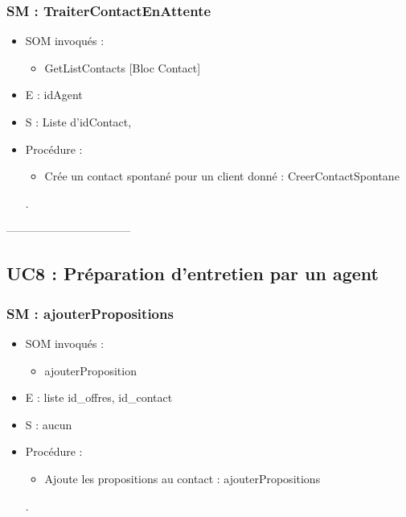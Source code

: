 \subsubsection{SM : TraiterContactEnAttente}
\begin{itemize}
	\item SOM invoqués : 
		\begin{itemize}
			\item GetListContacts [Bloc Contact]
		\end{itemize}
	\item E : idAgent
	\item S : Liste d’idContact, 
	\item Procédure : 
		\begin{itemize}
			\item Crée un contact spontané pour un client donné : CreerContactSpontane
		\end{itemize}.
\end{itemize}

---------------------------------
\subsection{UC8 : Préparation d’entretien par un agent}
\subsubsection{SM : ajouterPropositions}
\begin{itemize}
	\item SOM invoqués :
	\begin{itemize}
		\item ajouterProposition
	\end{itemize}
	\item E : liste id\_offres, id\_contact
	\item S : aucun
	\item Procédure :
	\begin{itemize}
		\item Ajoute les propositions au contact : ajouterPropositions
	\end{itemize}.
\end{itemize}


